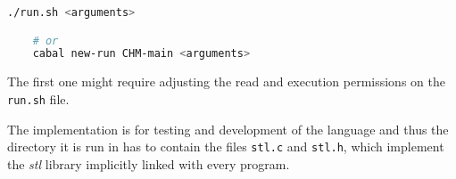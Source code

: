 \begin{lstlisting}[language=sh]
    ./run.sh <arguments>

    # or
    cabal new-run CHM-main <arguments>
\end{lstlisting}

The first one might require adjusting the read and execution permissions on the \lstinline[language=sh]{run.sh} file.

The implementation is for testing and development of the language and thus the directory it is run in has to contain the files \lstinline[language=sh]{stl.c} and  \lstinline[language=sh]{stl.h}, which implement the \emph{stl} library implicitly linked with every program.
